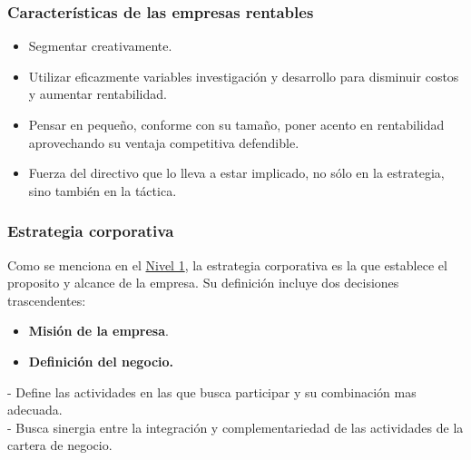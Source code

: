 \documentclass{templateNote}
\begin{document}
\subsubsection{Características de las empresas rentables}
\begin{itemize}
    \item Segmentar creativamente.
    \item Utilizar eficazmente variables investigación y desarrollo para disminuir costos y aumentar rentabilidad.
    \item Pensar en pequeño, conforme con su tamaño, poner acento en rentabilidad aprovechando su ventaja competitiva defendible.
    \item Fuerza del directivo que lo lleva a estar implicado, no sólo en la estrategia, sino también en la táctica.
\end{itemize}

\subsubsection{Estrategia corporativa}
\noindent Como se menciona en el \hyperlink{estrategia_corporativa}{Nivel 1}, la estrategia corporativa es la que establece el proposito y alcance de la empresa.
Su definición incluye dos decisiones trascendentes:
\begin{itemize}
    \item \textbf{Misión de la empresa}.
    \item \textbf{Definición del negocio.}
\end{itemize}
- Define las actividades en las que busca participar y su combinación mas adecuada.\\
- Busca sinergia entre la integración y complementariedad de las actividades de la cartera de negocio.\\
\end{document}
